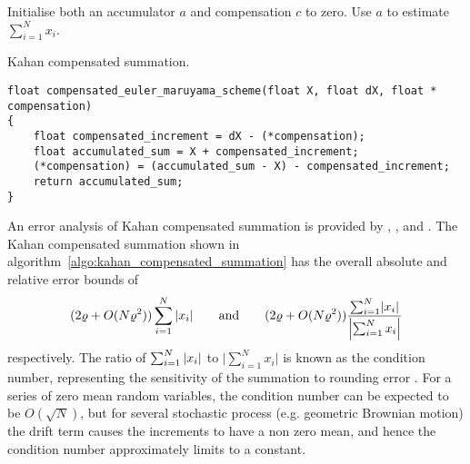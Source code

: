 \documentclass[9pt,a4paper,english]{extarticle}
\begin{document}
\begin{algorithm}[htb]
\DontPrintSemicolon
{}
Initialise both an accumulator $ a $ and compensation $ c $ to zero.\;
Use $ a $ to estimate $ \sum_{i=1}^{N} x_i $.\;
\caption[Kahan compensated summation ]{Kahan compensated summation.}
\label{algo:kahan_compensated_summation}
\end{algorithm}

\begin{lstfloat}[htb]
\begin{lstlisting}[style=C, caption={C implementation of the Euler-Maruyama scheme using Kahan compensated summation from  algorithm~\ref{algo:kahan_compensated_summation}.}, label={code:c:euler_maruyama_scheme_with_kahan_compensated_summation}]
float compensated_euler_maruyama_scheme(float X, float dX, float * compensation)
{
    float compensated_increment = dX - (*compensation); 
    float accumulated_sum = X + compensated_increment;
    (*compensation) = (accumulated_sum - X) - compensated_increment;
    return accumulated_sum;
}
\end{lstlisting}
\end{lstfloat}

An error analysis of Kahan compensated summation is provided by \citet[page~791, (3.11)]{higham1993accuracy}, \citet[Excercise~19, pages 229 and 571--573]{knuth2014art}, and \citet{goldberg1991every}. The Kahan compensated summation shown in  algorithm~\ref{algo:kahan_compensated_summation} has the overall absolute and relative error bounds of 
\begin{equation*}
(2\varrho + O(N\varrho^2))\sum_{i=1}^{N} \abs{x_i}
\qquad \text{and} \qquad
(2\varrho + O(N\varrho^2))\dfrac{\sum_{i=1}^{N} \lvert x_i\rvert}{\left\lvert \sum_{i=1}^{N} x_i\right\rvert} 
\end{equation*}
respectively. The ratio of
$ \sum_{i=1}^{N} \abs{x_i} $ to $\lvert \sum_{i=1}^{N} x_i\rvert $
is known as the condition number, representing the sensitivity of the summation to rounding error \citep{higham2002accuracy,trefethen1997numerical}. For a series of zero mean random variables, the condition number can be expected to be $ O(\sqrt{N}) $, but for several stochastic process (e.g. geometric Brownian motion) the drift term causes the increments to have a non zero mean, and hence the condition number approximately limits to a constant. 
\end{document}
